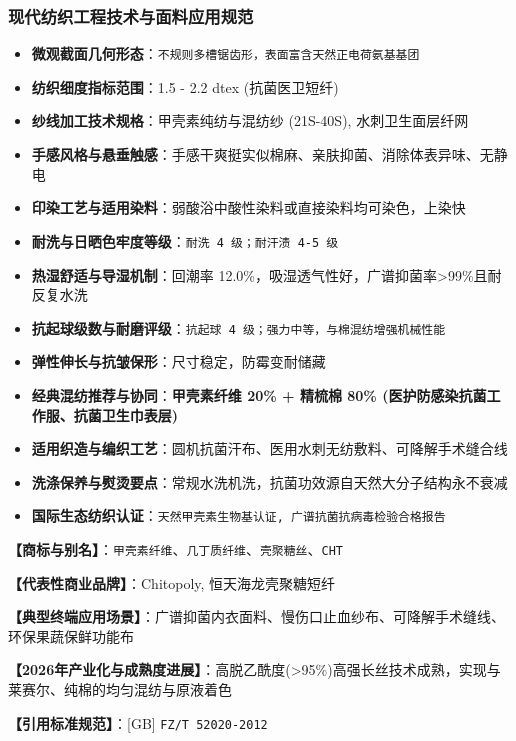 \documentclass[11pt,openright,twoside,UTF8]{ctexbook}
\begin{document}
\subsubsection*{现代纺织工程技术与面料应用规范}
\begin{itemize} \setlength{\itemsep}{2pt}
    \item \textbf{微观截面几何形态}：\texttt{不规则多槽锯齿形，表面富含天然正电荷氨基基团}
    \item \textbf{纺织细度指标范围}：1.5 - 2.2 dtex (抗菌医卫短纤)
    \item \textbf{纱线加工技术规格}：甲壳素纯纺与混纺纱 (21S-40S), 水刺卫生面层纤网
    \item \textbf{手感风格与悬垂触感}：手感干爽挺实似棉麻、亲肤抑菌、消除体表异味、无静电
    \item \textbf{印染工艺与适用染料}：弱酸浴中酸性染料或直接染料均可染色，上染快
    \item \textbf{耐洗与日晒色牢度等级}：\texttt{耐洗 4 级；耐汗渍 4-5 级}
    \item \textbf{热湿舒适与导湿机制}：回潮率 12.0\%，吸湿透气性好，广谱抑菌率\textgreater{}99\%且耐反复水洗
    \item \textbf{抗起球级数与耐磨评级}：\texttt{抗起球 4 级；强力中等，与棉混纺增强机械性能}
    \item \textbf{弹性伸长与抗皱保形}：尺寸稳定，防霉变耐储藏
    \item \textbf{经典混纺推荐与协同}：\textbf{甲壳素纤维 20\% + 精梳棉 80\% (医护防感染抗菌工作服、抗菌卫生巾表层)}
    \item \textbf{适用织造与编织工艺}：圆机抗菌汗布、医用水刺无纺敷料、可降解手术缝合线
    \item \textbf{洗涤保养与熨烫要点}：常规水洗机洗，抗菌功效源自天然大分子结构永不衰减
    \item \textbf{国际生态纺织认证}：\texttt{天然甲壳素生物基认证, 广谱抗菌抗病毒检验合格报告}
\end{itemize}
\vspace{0.2cm}

\noindent\textbf{【商标与别名】}：\texttt{甲壳素纤维}、\texttt{几丁质纤维}、\texttt{壳聚糖丝}、\texttt{CHT}\par
\noindent\textbf{【代表性商业品牌】}：Chitopoly, 恒天海龙壳聚糖短纤\par
\noindent\textbf{【典型终端应用场景】}：广谱抑菌内衣面料、慢伤口止血纱布、可降解手术缝线、环保果蔬保鲜功能布\par
\noindent\textbf{【2026年产业化与成熟度进展】}：高脱乙酰度(\textgreater{}95\%)高强长丝技术成熟，实现与莱赛尔、纯棉的均匀混纺与原液着色\par
\noindent\textbf{【引用标准规范】}：[GB] \texttt{FZ/T 52020-2012}\par
\vspace{0.5cm}
\end{document}
